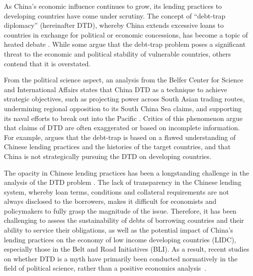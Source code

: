 As China's economic influence continues to grow, its lending practices to developing countries have come under scrutiny.
The concept of ``debt-trap diplomacy'' (hereinafter DTD), whereby China extends excessive loans to countries in exchange for political or economic concessions, has become a topic of heated debate \citet{Chellaney_2017}.
While some argue that the debt-trap problem poses a significant threat to the economic and political stability of vulnerable countries, others contend that it is overstated.

From the political science aspect, an analysis from the Belfer Center for Science and International Affairs states that China DTD as a technique to achieve strategic objectives, such as projecting power across South Asian trading routes, undermining regional opposition to its South China Sea claims, and supporting its naval efforts to break out into the Pacific \citep*{Parker2018}.
Critics of this phenomenon argue that claims of DTD are often exaggerated or based on incomplete information. For example, \citet*{Brautigam-meme-2020} argues that the debt-trap is based on a flawed understanding of Chinese lending practices and the histories of the target countries, and that China is not strategically pursuing the DTD on developing countries.

The opacity in Chinese lending practices has been a longstanding challenge in the analysis of the DTD problem \citep*{Horn-Reinhart-Trebesch-21}.
The lack of transparency in the Chinese lending system, whereby loan terms, conditions and collateral requirements are not always disclosed to the borrowers, makes it difficult for economists and policymakers to fully grasp the magnitude of the issue.
Therefore, it has been challenging to assess the sustainability of debts of borrowing countries and their ability to service their obligations, as well as the potential impact of China's lending practices on the economy of low income developing countries (LIDC), especially those in the Belt and Road Initiatives (BLI).
As a result, recent studies on whether DTD is a myth have primarily been conducted normatively in the field of political science, rather than a positive economics analysis~\citep[See, e.g.,][]{Himmer2023-vn,Chen2020-eo}.

